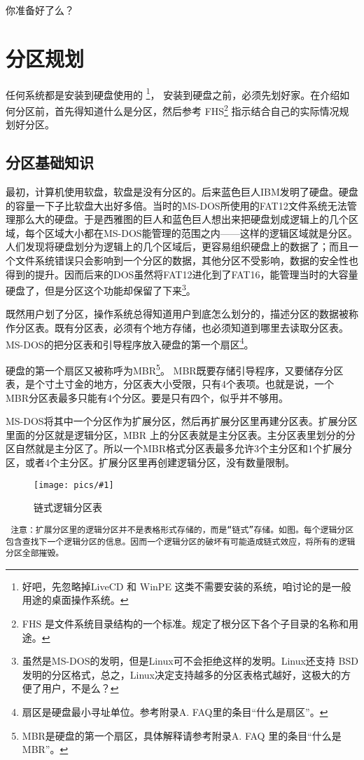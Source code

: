 \documentclass[amstex]{ctexbook}
\newenvironment{notice}{\tt}{}
\newcommand{\chatu}[2]{%
\begin{figure}[h]%
\centering%
\texttt{[image: pics/\#1]}%
\caption{#2}%
\end{figure}%
}
\begin{document}
你准备好了么？

\section{分区规划}
任何系统都是安装到硬盘使用的
\footnote{好吧，先忽略掉LiveCD 和  WinPE 这类不需要安装的系统，咱讨论的是一般用途的桌面操作系统。}，
安装到硬盘之前，必须先划好家。在介绍如何分区前，首先得知道什么是分区，然后参考
FHS\footnote{FHS 是文件系统目录结构的一个标准。规定了根分区下各个子目录的名称和用途。}
指示结合自己的实际情况规划好分区。

\subsection{分区基础知识}
最初，计算机使用软盘，软盘是没有分区的。后来蓝色巨人IBM发明了硬盘。硬盘的容量一下子比软盘大出好多倍。当时的MS-DOS所使用的FAT12文件系统无法管理那么大的硬盘。于是西雅图的巨人和蓝色巨人想出来把硬盘划成逻辑上的几个区域，每个区域大小都在MS-DOS能管理的范围之内——这样的逻辑区域就是分区。人们发现将硬盘划分为逻辑上的几个区域后，更容易组织硬盘上的数据了；而且一个文件系统错误只会影响到一个分区的数据，其他分区不受影响，数据的安全性也得到的提升。因而后来的DOS虽然将FAT12进化到了FAT16，能管理当时的大容量硬盘了，但是分区这个功能却保留了下来\footnote{虽然是MS-DOS的发明，但是Linux可不会拒绝这样的发明。Linux还支持 BSD 发明的分区格式，总之，Linux决定支持越多的分区表格式越好，这极大的方便了用户，不是么？}。

既然用户划了分区，操作系统总得知道用户到底怎么划分的，描述分区的数据被称作分区表。既有分区表，必须有个地方存储，也必须知道到哪里去读取分区表。MS-DOS的把分区表和引导程序放入硬盘的第一个扇区\footnote{扇区是硬盘最小寻址单位。参考附录A. FAQ里的条目“什么是扇区”。}。

硬盘的第一个扇区又被称呼为MBR\footnote{MBR是硬盘的第一个扇区，具体解释请参考附录A. FAQ 里的条目“什么是 MBR”。}。
MBR既要存储引导程序，又要储存分区表，是个寸土寸金的地方，分区表大小受限，只有4个表项。也就是说，一个 MBR分区表最多只能有4个分区。要是只有四个，似乎并不够用。

MS-DOS将其中一个分区作为扩展分区，然后再扩展分区里再建分区表。扩展分区里面的分区就是逻辑分区，MBR 上的分区表就是主分区表。主分区表里划分的分区自然就是主分区了。所以一个MBR格式分区表最多允许3个主分区和1个扩展分区，或者4个主分区。扩展分区里再创建逻辑分区，没有数量限制。
\chatu{logicalpart}{链式逻辑分区表}

\begin{notice}
注意：扩展分区里的逻辑分区并不是表格形式存储的，而是“链式”存储。如图。每个逻辑分区包含查找下一个逻辑分区的信息。因而一个逻辑分区的破坏有可能造成链式效应，将所有的逻辑分区全部摧毁。
\end{notice}
\end{document}
